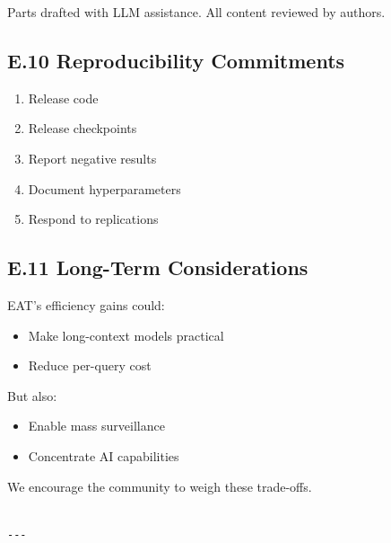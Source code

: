 Parts drafted with LLM assistance. All content reviewed by authors.

\subsection{E.10 Reproducibility Commitments}

\begin{enumerate}
\item Release code
\item Release checkpoints
\item Report negative results
\item Document hyperparameters
\item Respond to replications

\end{enumerate}
\subsection{E.11 Long-Term Considerations}

EAT's efficiency gains could:

\begin{itemize}
\item Make long-context models practical
\item Reduce per-query cost

\end{itemize}
But also:

\begin{itemize}
\item Enable mass surveillance
\item Concentrate AI capabilities

\end{itemize}
We encourage the community to weigh these trade-offs.
\begin{lstlisting}

---
\end{lstlisting}